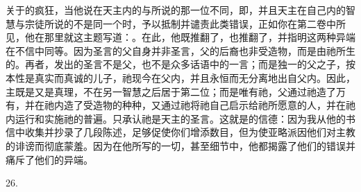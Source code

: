 \par

关于的疯狂，当他说在天主内的与所说的那一位不同，即，并且天主在自己内的智慧与宗徒所说的不是同一个时，予以抵制并谴责此类错误，正如你在第二卷中所见，他在那里就这主题写道：。在此，他既推翻了，也推翻了，并指明这两种异端在不信中同等。因为圣言的父自身并非圣言，父的后裔也非受造物，而是由祂所生的。再者，发出的圣言不是父，也不是众多话语中的一言；而是独一的父之子，按本性是真实而真诚的儿子，祂现今在父内，并且永恒而无分离地出自父内。因此，主既是又是真理，不在另一智慧之后居于第二位；而是唯有祂，父通过祂造了万有，并在祂内造了受造物的种种，又通过祂将祂自己启示给祂所愿意的人，并在祂内运行和实施祂的普遍。只承认祂是天主的圣言。这就是的信德：因为我从他的书信中收集并抄录了几段陈述，足够促使你们增添数目，但为使亚略派因他们对主教的诽谤而彻底蒙羞。因为在他所写的一切，甚至细节中，他都揭露了他们的错误并痛斥了他们的异端。\par

26. \par

